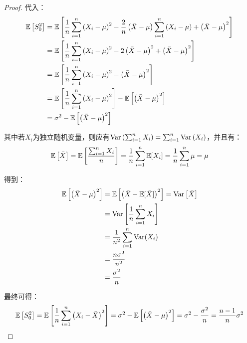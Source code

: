 \documentclass[11pt]{article}
\begin{document}
\begin{proof}
    代入：
    \begin{align*}
        \mathbb{E}\left[S_0^2\right] 
        &= \mathbb{E} \left[\frac{1}{n} \sum_{i=1}^{n} \left( X_i - \mu \right)^2 - \frac{2}{n} \left( \bar{X} - \mu \right) \sum_{i=1}^{n} \left( X_i - \mu \right) + \left( \bar{X} - \mu \right)^2 \right] \\
        &= \mathbb{E} \left[\frac{1}{n} \sum_{i=1}^{n} \left( X_i - \mu \right)^2 - 2 \left( \bar{X} - \mu \right)^2 + \left( \bar{X} - \mu \right)^2 \right] \\
        &= \mathbb{E} \left[\frac{1}{n} \sum_{i=1}^{n} \left( X_i - \mu \right)^2 - \left( \bar{X} - \mu \right)^2 \right] \\
        &= \mathbb{E} \left[\frac{1}{n} \sum_{i=1}^{n} \left( X_i - \mu \right)^2 \right] - \mathbb{E}\left[\left( \bar{X} - \mu \right)^2 \right] \\
        &= \sigma^2 - \mathbb{E}\left[\left( \bar{X} - \mu \right)^2 \right] \\
    \end{align*}

    其中若$X_i$为独立随机变量，则应有$\operatorname{Var}\left( \sum_{i=1}^{n} X_i \right) = \sum_{i=1}^{n} \operatorname{Var} \left( X_i \right)$，并且有：
    \begin{equation*}
        \mathbb{E}\left[\bar{X}\right] 
        = \mathbb{E}\left[\frac{\sum_{i=1}^{n} X_i}{n}\right]
        = \frac{1}{n} \sum_{i=1}^{n} \mathbb{E}[X_i]
        = \frac{1}{n} \sum_{i=1}^{n} \mu
        = \mu
    \end{equation*}
    
    得到：
    \begin{align*}
        \mathbb{E}\left[\left( \bar{X} - \mu \right)^2 \right]
        &= \mathbb{E}\left[\left( \bar{X} - \mathbb{E}[\bar{X}] \right)^2 \right]
        = \operatorname{Var}\left[ \bar{X} \right] \\
        &= \operatorname{Var}\left[ \frac{1}{n} \sum_{i=1}^{n} X_i \right] \\
        &= \frac{1}{n^2} \sum_{i=1}^{n} \operatorname{Var}(X_i) \\
        &= \frac{n \sigma^2}{n^2} \\
        &= \frac{\sigma^2}{n}
    \end{align*}

    最终可得：
    \begin{equation*}
        \mathbb{E}\left[S_0^2\right] 
        = \mathbb{E} \left[\frac{1}{n} \sum_{i=1}^{n} \left( X_i - \bar{X} \right)^2 \right]
        = \sigma^2 - \mathbb{E}\left[\left( \bar{X} - \mu \right)^2 \right]
        = \sigma^2 - \frac{\sigma^2}{n}
        = \frac{n-1}{n} \sigma^2
    \end{equation*}


\end{proof}
\end{document}

